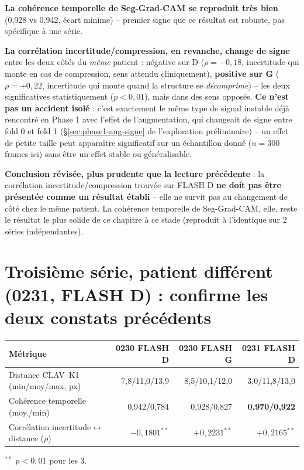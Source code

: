 \documentclass[11pt,a4paper]{report}
\begin{document}
\textbf{La cohérence temporelle de Seg-Grad-CAM se reproduit très bien}
(0,928 vs 0,942, écart minime) -- premier signe que ce résultat est robuste, pas
spécifique à une série.

\textbf{La corrélation incertitude/compression, en revanche, change de signe} entre
les deux côtés du \emph{même} patient : négative sur D ($\rho=-0{,}18$, incertitude
qui monte en cas de compression, sens attendu cliniquement), \textbf{positive sur G}
($\rho=+0{,}22$, incertitude qui monte quand la structure se
\emph{décomprime}) -- les deux significatives statistiquement ($p<0{,}01$), mais
dans des sens opposés. \textbf{Ce n'est pas un accident isolé} : c'est exactement le
même type de signal instable déjà rencontré en Phase 1 avec l'effet de
l'augmentation, qui changeait de signe entre fold 0 et fold 1
(\S\ref{sec:phase1-aug-signe} de l'exploration préliminaire) -- un effet de petite
taille peut apparaître significatif sur un échantillon donné ($n=300$ frames ici)
sans être un effet stable ou généralisable.

\textbf{Conclusion révisée, plus prudente que la lecture précédente} : la
corrélation incertitude/compression trouvée sur FLASH D \textbf{ne doit pas être
présentée comme un résultat établi} -- elle ne survit pas au changement de côté
chez le même patient. La cohérence temporelle de Seg-Grad-CAM, elle, reste le
résultat le plus solide de ce chapitre à ce stade (reproduit à l'identique sur 2
séries indépendantes).

\section{Troisième série, patient différent (0231, FLASH D) : confirme les deux
constats précédents}

\begin{center}
\begin{tabular}{lrrr}
\toprule
Métrique & 0230 FLASH D & 0230 FLASH G & 0231 FLASH D \\
\midrule
Distance CLAV--K1 (min/moy/max, px) & 7,8/11,0/13,9 & 8,5/10,1/12,0 & 3,0/11,8/13,0 \\
Cohérence temporelle (moy./min) & 0,942/0,784 & 0,928/0,827 & \textbf{0,970/0,922} \\
Corrélation incertitude$\leftrightarrow$distance ($\rho$) & $-0{,}1801^{**}$ &
    $+0{,}2231^{**}$ & $+0{,}2165^{**}$ \\
\bottomrule
\end{tabular}
\end{center}
{\footnotesize $^{**}$ $p<0{,}01$ pour les 3.}
\end{document}
